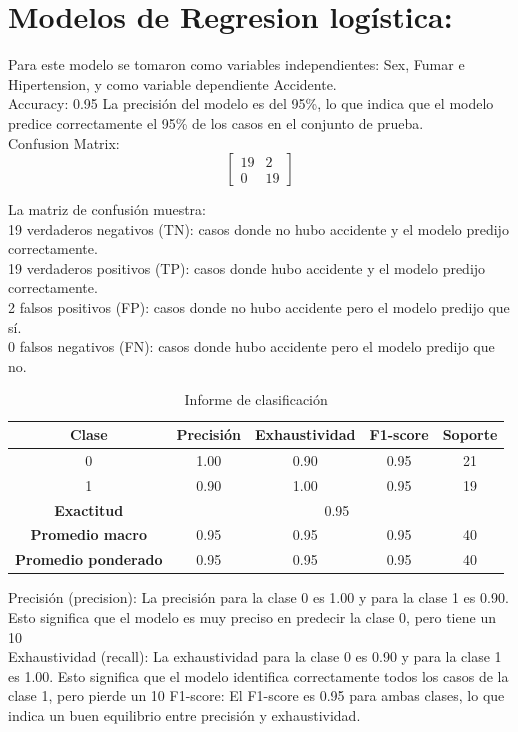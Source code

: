 \documentclass[a4paper, 12pt]{article}
\begin{document}
\section{Modelos de Regresion logística:}
Para este modelo se tomaron como variables independientes: Sex, Fumar e Hipertension, y como
variable dependiente Accidente.
\\
Accuracy: 0.95
La precisión del modelo es del 95\%, lo que indica que el modelo 
predice correctamente el 95\% de los casos en el conjunto de prueba.
\\
Confusion Matrix:
\[
\begin{bmatrix}
19 & 2 \\
0 & 19
\end{bmatrix}\]

La matriz de confusión muestra:
\\
19 verdaderos negativos (TN): casos donde no hubo accidente y el modelo predijo correctamente.
\\
19 verdaderos positivos (TP): casos donde hubo accidente y el modelo predijo correctamente.
\\
2 falsos positivos (FP): casos donde no hubo accidente pero el modelo predijo que sí.
\\
0 falsos negativos (FN): casos donde hubo accidente pero el modelo predijo que no.

\begin{table}[H]
    \centering
    \begin{tabular}{|c|c|c|c|c|}
        \hline
        Clase & Precisión & Exhaustividad & F1-score & Soporte \\ \hline
        0 & 1.00 & 0.90 & 0.95 & 21 \\ \hline
        1 & 0.90 & 1.00 & 0.95 & 19 \\ \hline
        \textbf{Exactitud} & \multicolumn{4}{c|}{0.95} \\ \hline
        \textbf{Promedio macro} & 0.95 & 0.95 & 0.95 & 40 \\ \hline
        \textbf{Promedio ponderado} & 0.95 & 0.95 & 0.95 & 40 \\ \hline
    \end{tabular}
    \caption{Informe de clasificación}
    \label{tab:classification_report}
\end{table}


Precisión (precision): La precisión para la clase 0 es 1.00 y para la clase 1 es 0.90. Esto significa que el modelo es muy preciso en predecir la clase 0, pero tiene un 10%
\\
Exhaustividad (recall): La exhaustividad para la clase 0 es 0.90 y para la clase 1 es 1.00. Esto significa que el modelo identifica correctamente todos los casos de la clase 1, pero pierde un 10%
F1-score: El F1-score es 0.95 para ambas clases, lo que indica un buen equilibrio entre precisión y exhaustividad.
\end{document}

